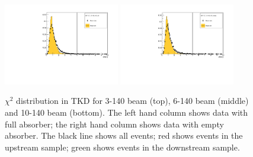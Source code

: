 \begin{figure}[!tbh]
    \includegraphics*[width=0.45\textwidth]{02-Cuts/Figures/2017-2.7_10-140_lH2_full/tkd_chi2_ds_cut.pdf}
    \includegraphics*[width=0.45\textwidth]{02-Cuts/Figures/2017-2.7_10-140_lH2_empty/tkd_chi2_ds_cut.pdf}
    \caption{$\chi^2$ distribution in TKD for 3-140 beam (top), 6-140 beam (middle) and 10-140 beam (bottom).
    The left hand column shows data with full absorber; the right hand column shows data with empty absorber.
    The black line shows all events; red shows events in the upstream sample; green shows events in the downstream sample.
\label{fig:tkd_chi2}}
\end{figure}

